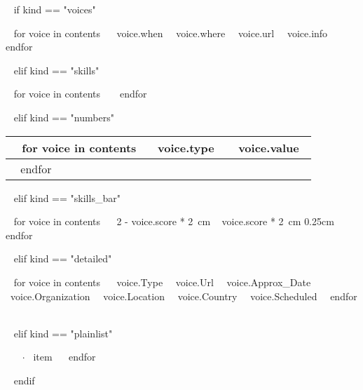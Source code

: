 
~{ if kind == "voices" }~

    ~{ for voice in contents }~
        {~{{voice.when}}~}
        {~{{voice.where}}~}
        {~{{voice.url}}~}       
        {~{{voice.info}}~}~{ endfor }~

~{ elif kind == "skills" }~
    
    ~{ for voice in contents }~
    ~{ endfor }~

~{ elif kind == "numbers" }~
    
    \begin{tabularx}{\linewidth}{|X|c|}
    \hline
    ~{ for voice in contents }~
    ~{{voice.type}}~ & ~{{voice.value}}~ \\
    \hline
    ~{ endfor }~
    \end{tabularx}
    \vspace{1em}

~{ elif kind == "skills_bar" }~
    
    ~{ for voice in contents }~
    {~{{2 - voice.score * 2}}~cm}
    {~{{    voice.score * 2}}~cm}
    {0.25cm}~{ endfor }~

~{ elif kind == "detailed" }~

    ~{ for voice in contents }~
        {~{{voice.Type}}~}
        {~{{voice.Url}}~}
        {~{{voice.Approx_Date}}~}
        {~{{voice.Organization}}~}
        {~{{voice.Location}}~}
        {~{{voice.Country}}~}
        {~{{voice.Scheduled}}~}~{ endfor }~

~{ elif kind == "plainlist" }~
    
    \begin{itemize}[leftmargin=*, itemsep=0pt, parsep=0pt, topsep=0pt, partopsep=0pt]
    ~{ for item in contents }~
    \item[$\cdot$] ~{{item}}~
    ~{ endfor }~
    \end{itemize}
    \vspace{1em}

~{ endif }~


